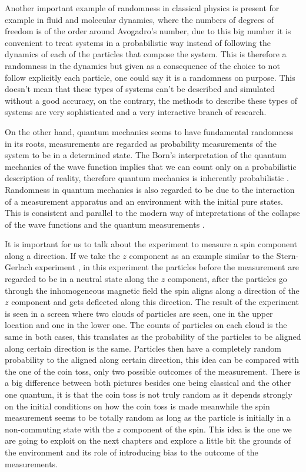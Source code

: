 Another important example of randomness in classical physics is present for example in fluid and molecular dynamics, where the numbers of degrees of freedom is of the order around Avogadro's number, due to this big number it is convenient to treat systems in a probabilistic way instead of following the dynamics of each of the particles that compose the system. This is therefore a randomness in the dynamics but given as a consequence of the choice to not follow explicitly each particle, one could say it is a randomness on purpose. This doesn't mean that these types of systems can't be described and simulated without a good accuracy, on the contrary, the methods to describe these types of systems are very sophisticated and a very interactive branch of research\cite{ghil2012topics}\cite{liu2008location}.

On the other hand, quantum mechanics seems to have fundamental randomness in its roots, measurements are regarded as probability measurements of the system to be in a determined state.  The Born's interpretation of the quantum mechanics of the wave function implies that we can count only on a probabilistic description of reality, therefore quantum mechanics is inherently probabilistic \cite{born1955statistical}. Randomness in quantum mechanics is also regarded to be due to the interaction of a measurement apparatus and an environment with the initial pure states. This is consistent and parallel to the modern way of intepretations of the collapse of the wave functions and the quantum measurements \cite{wheeler2014quantum} 	\cite{zurek2003decoherence}\cite{zurek2009quantum}.\par 

It is important for us to talk about the experiment to measure a spin component along a direction. If we take the $z$ component  as an example similar to the Stern-Gerlach experiment \cite{gerlach1922experimentelle}, in this experiment the particles before the measurement are regarded to be in a neutral state along the $z$ component, after the particles go through the inhomogeneous magnetic field the spin aligns along a direction of the $z$ component and gets deflected along this direction. The result of the experiment is seen in a screen where two clouds of particles are seen, one in the upper location and one in the lower one. The counts of particles on each cloud is the same in both cases, this translates as the probability of the particles to be aligned along certain direction is the same. Particles then have a completely random probability to the aligned along certain direction, this idea can be compared with the one of the coin toss, only two possible outcomes of the measurement. There is a big difference between both pictures besides one being classical and the other one quantum, it is that the coin toss is not truly random as it depends strongly on the initial conditions on how the coin toss is made meanwhile the spin measurement seems to be totally random as long as the particle is initially in a non-commuting state with the $z$ component of the spin. This idea is the one we are going to exploit on the next chapters and explore a little bit the grounds of the environment and its role of introducing bias to the outcome of the measurements.


